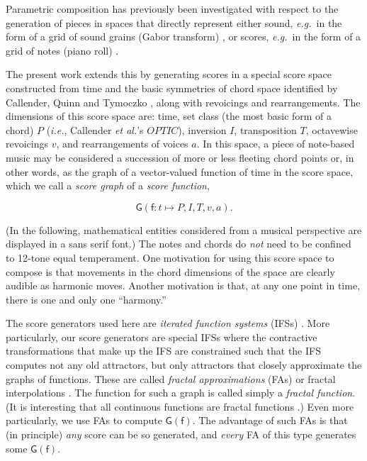 \documentclass[english,11pt,letterpaper,onecolumn]{scrartcl}
\numberwithin{equation}{section}
\begin{document}
Parametric composition has previously been investigated with respect to the
generation of pieces in spaces that directly represent either sound,
\textit{e.g.}\ in the form of a grid of sound grains (Gabor transform)
\cite{obsessed}, or scores, \textit{e.g.}\ in the form of a grid of notes (piano
roll) \cite{ifsmusic}.

The present work extends this by generating scores in a special score space
constructed from time and the basic symmetries of chord space identified by
Callender, Quinn and Tymoczko \cite{callender:346}, along with revoicings and
rearrangements. The dimensions of this score space are: time, set class (the
most basic form of a  chord) $P$ (\textit{i.e.}, Callender \textit{et al.}'s
$OPTIC$), inversion $I$, transposition $T$, octavewise revoicings $v$, and
rearrangements of voices $a$. In this space, a piece of note-based music may be
considered a succession of more or less fleeting chord points or, in other
words, as the graph of a vector-valued function of time in the score space,
which we call a \textit{score graph} of a \textit{score function},

$$\mathsf{G}(\mathsf{f}: t \mapsto P, I, T, v, a).$$

\noindent (In the following, mathematical entities considered from a musical
perspective are displayed in a \textsf{sans serif} font.) The notes and chords
do \textit{not} need to be confined to 12-tone equal temperament. One motivation
for using this score space to compose is that movements in the chord dimensions
of the space are clearly audible as harmonic moves. Another motivation is that,
at any one point in time, there is one and only one ``harmony.''

The score generators used here are \textit{iterated function systems} (IFSs)
\cite{barnsley1985iterated, 10.2307/24893080, fractalseverywhere}. More
particularly, our score generators are special IFSs where the contractive
transformations that make up the IFS are constrained such that the IFS computes
not any old attractors, but only attractors that closely approximate the graphs
of functions. These are called \textit{fractal approximations} (FAs) or fractal
interpolations \cite{Barnsley1986, fractalseverywhere, navascues2014fractal}.
The function for such a graph is called simply a \textit{fractal function}. (It
is interesting that all continuous functions are fractal functions
\cite{2016arXiv161001369B}.) Even more particularly, we use FAs to compute
$\mathsf{G(f)}$. The advantage of such FAs is that (in principle) \textit{any}
score can be so generated, and \textit{every} FA of this type generates some
$\mathsf{G(f)}$.
\end{document}
